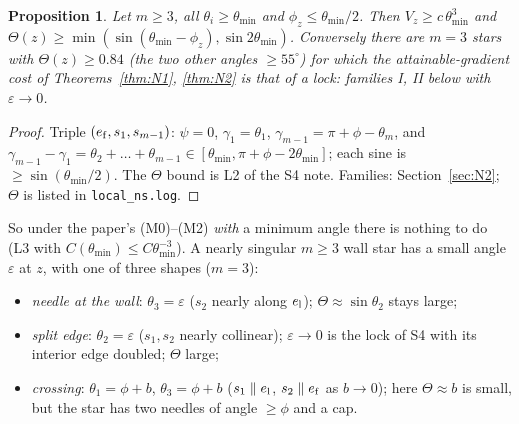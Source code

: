 \documentclass[11pt]{article}
\newtheorem{proposition}[theorem]{Proposition}
\theoremstyle{remark}
\begin{document}
\begin{proposition}\label{prop:G}
Let $m\ge3$, all $\theta_i\ge\theta_{\min}$ and $\phi_z\le\theta_{\min}/2$. Then $V_z\ge c\,\theta_{\min}^3$ and
$\Theta(z)\ge\min(\sin(\theta_{\min}-\phi_z),\sin2\theta_{\min})$. Conversely there are $m=3$ stars with $\Theta(z)\ge0.84$
(the two other angles $\ge55^\circ$) for which the attainable-gradient cost of Theorems~\ref{thm:N1}, \ref{thm:N2} is
that of a lock: families I, II below with $\varepsilon\to0$.
\end{proposition}
\begin{proof}
Triple $(e_{\rm f},s_1,s_{m-1})$: $\psi=0$, $\gamma_1=\theta_1$, $\gamma_{m-1}=\pi+\phi-\theta_m$, and
$\gamma_{m-1}-\gamma_1=\theta_2+\dots+\theta_{m-1}\in[\theta_{\min},\pi+\phi-2\theta_{\min}]$; each sine is $\ge\sin(\theta_{\min}/2)$.
The $\Theta$ bound is L2 of the S4 note. Families: Section~\ref{sec:N2}; $\Theta$ is listed in \texttt{local\_ns.log}.
\end{proof}
So under the paper's (M0)--(M2) \emph{with} a minimum angle there is nothing to do (L3 with $C(\theta_{\min})\le C\theta_{\min}^{-3}$).
A nearly singular $m\ge3$ wall star has a small angle $\varepsilon$ at $z$, with one of three shapes ($m=3$):
\begin{itemize}
\item[I] \emph{needle at the wall}: $\theta_3=\varepsilon$ ($s_2$ nearly along $e_{\rm l}$); $\Theta\approx\sin\theta_2$ stays large;
\item[II] \emph{split edge}: $\theta_2=\varepsilon$ ($s_1,s_2$ nearly collinear); $\varepsilon\to0$ is the lock of S4 with its interior edge doubled; $\Theta$ large;
\item[III] \emph{crossing}: $\theta_1=\phi+b$, $\theta_3=\phi+b$ ($s_1\parallel e_{\rm l}$, $s_2\parallel e_{\rm f}$ as $b\to0$); here $\Theta\approx b$ is small,
but the star has two needles of angle $\ge\phi$ and a cap.
\end{itemize}
\end{document}
